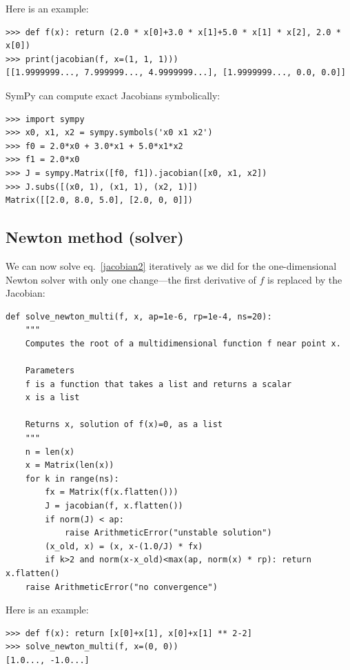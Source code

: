 \documentclass[justified, sixbynine]{tufte-book}
\def\ft{\small\tt}
\theoremstyle{plain}%
\newtheorem * {corollary}{Corollary}
\theoremstyle{definition}
\theoremstyle{remark}
\newtheorem * {remark}{Remark}
\newtheorem * {note}{Note}
\begin{document}
\begin{fullwidth}
Here is an example:

\begin{lstlisting}[caption={in file: {\ft nlib.py}}]
>>> def f(x): return (2.0 * x[0]+3.0 * x[1]+5.0 * x[1] * x[2], 2.0 * x[0])
>>> print(jacobian(f, x=(1, 1, 1)))
[[1.9999999..., 7.999999..., 4.9999999...], [1.9999999..., 0.0, 0.0]]
\end{lstlisting}

SymPy can compute exact Jacobians symbolically:

\begin{lstlisting}
>>> import sympy
>>> x0, x1, x2 = sympy.symbols('x0 x1 x2')
>>> f0 = 2.0*x0 + 3.0*x1 + 5.0*x1*x2
>>> f1 = 2.0*x0
>>> J = sympy.Matrix([f0, f1]).jacobian([x0, x1, x2])
>>> J.subs([(x0, 1), (x1, 1), (x2, 1)])
Matrix([[2.0, 8.0, 5.0], [2.0, 0, 0]])
\end{lstlisting}

\goodbreak\subsection{Newton method (solver)}


We can now solve eq.~\ref{jacobian2} iteratively as we did for the one-dimensional Newton solver with only one change---the first derivative of $f$ is replaced by the Jacobian:

\begin{lstlisting}[caption={in file: {\ft nlib.py}}]
def solve_newton_multi(f, x, ap=1e-6, rp=1e-4, ns=20):
    """
    Computes the root of a multidimensional function f near point x.

    Parameters
    f is a function that takes a list and returns a scalar
    x is a list

    Returns x, solution of f(x)=0, as a list
    """
    n = len(x)
    x = Matrix(len(x))
    for k in range(ns):
        fx = Matrix(f(x.flatten()))
        J = jacobian(f, x.flatten())
        if norm(J) < ap:
            raise ArithmeticError("unstable solution")
        (x_old, x) = (x, x-(1.0/J) * fx)
        if k>2 and norm(x-x_old)<max(ap, norm(x) * rp): return x.flatten()
    raise ArithmeticError("no convergence")
\end{lstlisting}

Here is an example:

\begin{lstlisting}[caption={in file: {\ft nlib.py}}]
>>> def f(x): return [x[0]+x[1], x[0]+x[1] ** 2-2]
>>> solve_newton_multi(f, x=(0, 0))
[1.0..., -1.0...]
\end{lstlisting}


\end{fullwidth}
\end{document}
